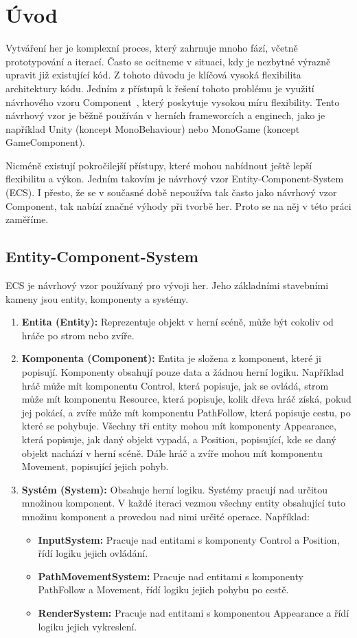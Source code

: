 \chapter{Úvod}

Vytváření her je komplexní proces, který zahrnuje mnoho fází, včetně prototypování a iterací. Často se ocitneme v situaci, kdy je nezbytné výrazně upravit již existující kód. Z tohoto důvodu je klíčová vysoká flexibilita architektury kódu. Jedním z přístupů k řešení tohoto problému je využití návrhového vzoru Component~\cite{nystrom2014game}, který poskytuje vysokou míru flexibility. Tento návrhový vzor je běžně používán v herních frameworcích a enginech, jako je například Unity (koncept MonoBehaviour) nebo MonoGame (koncept GameComponent).

Nicméně existují pokročilejší přístupy, které mohou nabídnout ještě lepší flexibilitu a výkon. Jedním takovím je návrhový vzor Entity-Component-System~\cite{Caini_2019} (ECS). I přesto, že se v současné době nepoužíva tak často jako návrhový vzor Component, tak nabízí značné výhody při tvorbě her. Proto se na něj v této práci zaměříme.

\section{Entity-Component-System}
ECS je návrhový vzor používaný pro vývoji her. Jeho základními stavebními kameny jsou entity, komponenty a systémy.

\begin{enumerate}
    \item \textbf{Entita (Entity):} Reprezentuje objekt v herní scéně, může být cokoliv od hráče po strom nebo zvíře.
    \item \textbf{Komponenta (Component):} Entita je složena z komponent, které ji popisují. Komponenty obsahují pouze data a žádnou herní logiku. Například hráč může mít komponentu Control, která popisuje, jak se ovládá, strom může mít komponentu Resource, která popisuje, kolik dřeva hráč získá, pokud jej pokácí, a zvíře může mít komponentu PathFollow, která popisuje cestu, po které se pohybuje. Všechny tři entity mohou mít komponenty Appearance, která popisuje, jak daný objekt vypadá, a Position, popisující, kde se daný objekt nachází v herní scéně. Dále hráč a zvíře mohou mít komponentu Movement, popisující jejich pohyb.
    \item \textbf{Systém (System):} Obsahuje herní logiku. Systémy pracují nad určitou množinou komponent. V každé iteraci vezmou všechny entity obsahující tuto množinu komponent a provedou nad nimi určité operace. Například:
    \begin{itemize}
        \item \textbf{InputSystem:} Pracuje nad entitami s komponenty Control a Position, řídí logiku jejich ovládání.
        \item \textbf{PathMovementSystem:} Pracuje nad entitami s komponenty PathFollow a Movement, řídí logiku jejich pohybu po cestě.
        \item \textbf{RenderSystem:} Pracuje nad entitami s komponentou Appearance a řídí logiku jejich vykreslení.
    \end{itemize}
\end{enumerate}

